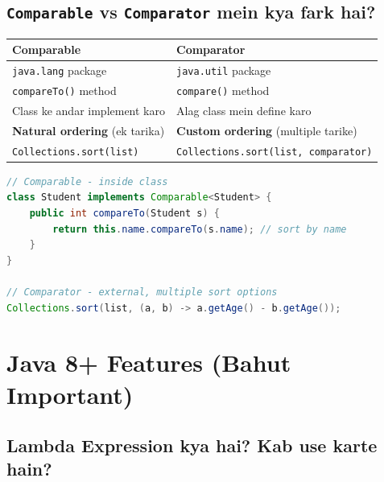 \documentclass[12pt,a4paper]{article}
\begin{document}
\subsection{\texttt{Comparable} vs \texttt{Comparator} mein kya fark hai?}

\begin{answerbox}
\begin{center}
\begin{tabular}{p{6cm} p{6cm}}
\toprule
\textbf{Comparable} & \textbf{Comparator} \\
\midrule
\texttt{java.lang} package & \texttt{java.util} package \\
\texttt{compareTo()} method & \texttt{compare()} method \\
Class ke andar implement karo & Alag class mein define karo \\
\textbf{Natural ordering} (ek tarika) & \textbf{Custom ordering} (multiple tarike) \\
\texttt{Collections.sort(list)} & \texttt{Collections.sort(list, comparator)} \\
\bottomrule
\end{tabular}
\end{center}
\begin{lstlisting}[language=Java]
// Comparable - inside class
class Student implements Comparable<Student> {
    public int compareTo(Student s) {
        return this.name.compareTo(s.name); // sort by name
    }
}

// Comparator - external, multiple sort options
Collections.sort(list, (a, b) -> a.getAge() - b.getAge());
\end{lstlisting}
\end{answerbox}

\section{Java 8+ Features (Bahut Important)}

\setcounter{subsection}{46}

\subsection{Lambda Expression kya hai? Kab use karte hain?}
\end{document}
